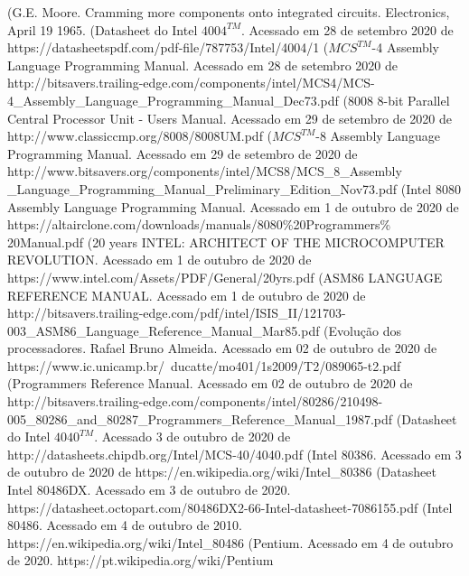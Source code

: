 \documentclass[12pt]{article}
\begin{document}
\begin{thebibliography}{99}%
	\bibitem[1](G.E. Moore. Cramming more components onto
	integrated circuits. Electronics, April 19
	1965.
	\bibitem[2] (Datasheet do Intel $4004^{TM}$. Acessado em 28 de setembro 2020 de https://datasheetspdf.com/pdf-file/787753/Intel/4004/1
	\bibitem[3] ($MCS^{TM}$-4 Assembly Language Programming Manual. Acessado em 28 de setembro 2020 de http://bitsavers.trailing-edge.com/components/intel/MCS4/MCS-4\_Assembly\_Language\_Programming\_Manual\_Dec73.pdf
	\bibitem[4] (8008 8-bit Parallel Central Processor Unit - Users Manual. Acessado em 29 de setembro de 2020 de 
	http://www.classiccmp.org/8008/8008UM.pdf
	\bibitem[5] ($MCS^{TM}$-8 Assembly Language Programming Manual. Acessado em 29 de setembro de 2020 de http://www.bitsavers.org/components/intel/MCS8/MCS\_8\_Assembly
	\_Language\_Programming\_Manual\_Preliminary\_Edition\_Nov73.pdf
	\bibitem[5] (Intel 8080 Assembly Language Programming Manual. Acessado em 1 de outubro de 2020 de https://altairclone.com/downloads/manuals/8080\%20Programmers\%
	20Manual.pdf
	\bibitem[6] (20 years INTEL: ARCHITECT OF THE MICROCOMPUTER REVOLUTION. Acessado em 1 de outubro de 2020 de https://www.intel.com/Assets/PDF/General/20yrs.pdf
	\bibitem[7](ASM86 LANGUAGE REFERENCE MANUAL. Acessado em 1 de outubro de 2020 de http://bitsavers.trailing-edge.com/pdf/intel/ISIS\_II/121703-003\_ASM86\_Language\_Reference\_Manual\_Mar85.pdf
	\bibitem[8] (Evolução dos processadores. Rafael Bruno Almeida. Acessado em 02 de outubro de 2020 de https://www.ic.unicamp.br/~ducatte/mo401/1s2009/T2/089065-t2.pdf
	\bibitem[9](Programmers Reference Manual. Acessado em 02 de outubro de 2020 de http://bitsavers.trailing-edge.com/components/intel/80286/210498-005\_80286\_and\_80287\_Programmers\_Reference\_Manual\_1987.pdf
	\bibitem[10] (Datasheet do Intel $4040^{TM}$. Acessado 3 de outubro de 2020 de http://datasheets.chipdb.org/Intel/MCS-40/4040.pdf
	\bibitem[11] (Intel 80386. Acessado em 3 de outubro de 2020 de https://en.wikipedia.org/wiki/Intel\_80386
	\bibitem[12] (Datasheet Intel 80486DX. Acessado em 3 de outubro de 2020. https://datasheet.octopart.com/80486DX2-66-Intel-datasheet-7086155.pdf
	\bibitem[13] (Intel 80486. Acessado em 4 de outubro de 2010. https://en.wikipedia.org/wiki/Intel\_80486
	\bibitem[14] (Pentium. Acessado em 4 de outubro de 2020. https://pt.wikipedia.org/wiki/Pentium
\end{thebibliography}
\end{document}

